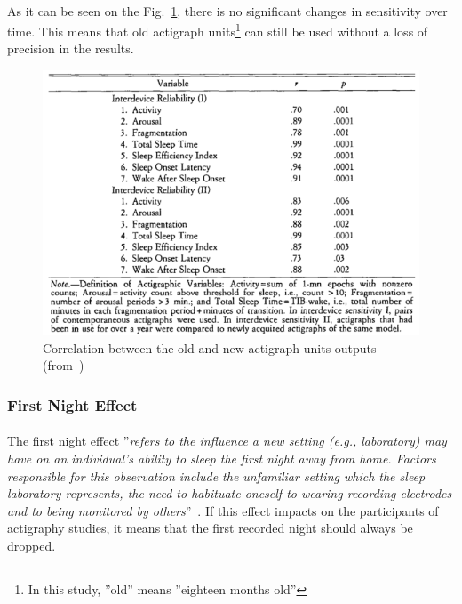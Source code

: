 \documentclass[a4paper,12pt]{article}
\begin{document}
\paragraph{}
As it can be seen on the Fig.~\ref{actiReliability}, there is no significant changes in sensitivity over time. This means that old actigraph units\footnote{In this study, ''old'' means ''eighteen months old''} can still be used without a loss of precision in the results.

\begin{figure}[H]
\centering
\includegraphics[scale=0.5]{Images/actiReliability.png}
\caption{Correlation between the old and new actigraph units outputs (from~\cite{Jean-Louis1997a})}
\label{actiReliability}
\end{figure}

\subsubsection{First Night Effect}

\paragraph{}
The first night effect ''\textit{refers to the influence a new setting (e.g., laboratory) may have on an individual's ability to sleep the first night away from home. Factors responsible for this observation include the unfamiliar setting which the sleep laboratory represents, the need to habituate oneself to wearing recording electrodes and to being monitored by others}''~\cite{Jean-Louis1997a}. If this effect impacts on the participants of actigraphy studies, it means that the first recorded night should always be dropped.
\end{document}
